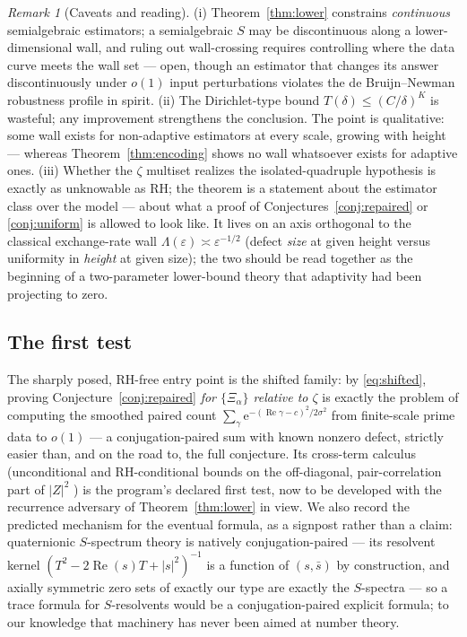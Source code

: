\documentclass[11pt]{amsart}
\theoremstyle{plain}
\theoremstyle{definition}
\theoremstyle{remark}
\newtheorem{remark}[theorem]{Remark}
\newcommand{\re}{\operatorname{Re}}
\newcommand{\eE}{\mathrm{e}}
\begin{document}
\begin{remark}[Caveats and reading]\label{rem:caveats}
(i) Theorem~\ref{thm:lower} constrains \emph{continuous} semialgebraic estimators; a semialgebraic
$S$ may be discontinuous along a lower-dimensional wall, and ruling out wall-crossing requires
controlling where the data curve meets the wall set --- open, though an estimator that changes its
answer discontinuously under $o(1)$ input perturbations violates the de Bruijn--Newman robustness
profile in spirit. (ii) The Dirichlet-type bound $T(\delta)\le(C/\delta)^K$ is wasteful; any
improvement strengthens the conclusion. The point is qualitative: some wall exists for
non-adaptive estimators at every scale, growing with height --- whereas
Theorem~\ref{thm:encoding} shows no wall whatsoever exists for adaptive ones. (iii) Whether the
$\zeta$ multiset realizes the isolated-quadruple hypothesis is exactly as unknowable as RH; the
theorem is a statement about the estimator class over the model --- about what a proof of
Conjectures~\ref{conj:repaired} or \ref{conj:uniform} is allowed to look like. It lives on an axis
orthogonal to the classical exchange-rate wall $\Lambda(\varepsilon)\asymp\varepsilon^{-1/2}$
(defect \emph{size} at given height versus uniformity in \emph{height} at given size); the two
should be read together as the beginning of a two-parameter lower-bound theory that adaptivity had
been projecting to zero.
\end{remark}

\subsection{The first test}
The sharply posed, RH-free entry point is the shifted family: by \eqref{eq:shifted}, proving
Conjecture~\ref{conj:repaired} \emph{for $\{\Xi_\alpha\}$ relative to $\zeta$} is exactly the
problem of computing the smoothed paired count
$\sum_\gamma\eE^{-(\re\gamma-c)^2/2\sigma^2}$ from finite-scale prime data to $o(1)$ --- a
conjugation-paired sum with known nonzero defect, strictly easier than, and on the road to, the
full conjecture. Its cross-term calculus (unconditional and RH-conditional bounds on the
off-diagonal, pair-correlation part of $|Z|^2$ \cite{Montgomery1973,GoldstonMontgomery1987}) is
the program's declared first test, now to be developed with the recurrence adversary of
Theorem~\ref{thm:lower} in view. We also record the predicted mechanism for the eventual
formula, as a signpost rather than a claim: quaternionic $S$-spectrum theory
\cite{ColomboSabadiniStruppa2011,ACK2016} is natively conjugation-paired --- its resolvent kernel
$(T^2-2\re(s)T+|s|^2)^{-1}$ is a function of $(s,\bar s)$ by construction, and axially symmetric
zero sets of exactly our type are exactly the $S$-spectra --- so a trace formula for
$S$-resolvents would be a conjugation-paired explicit formula; to our knowledge that machinery has
never been aimed at number theory.
\end{document}
